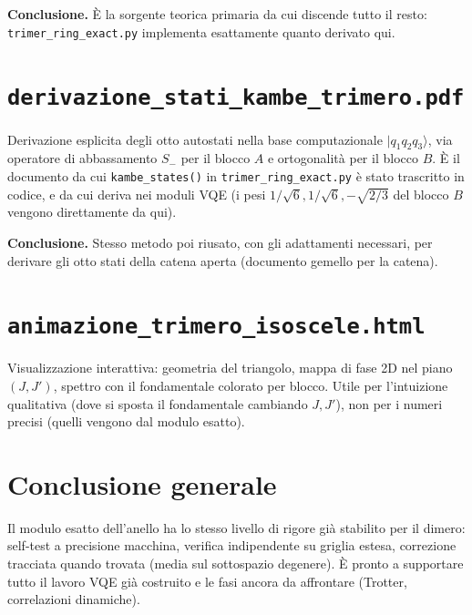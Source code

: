 \documentclass[11pt,a4paper]{article}
\begin{document}
\textbf{Conclusione.} È la sorgente teorica primaria da cui discende tutto il resto:
\texttt{trimer\_ring\_exact.py} implementa esattamente quanto derivato qui.

\section*{\texttt{derivazione\_stati\_kambe\_trimero.pdf}}

Derivazione esplicita degli otto autostati nella base computazionale
$|q_1q_2q_3\rangle$, via operatore di abbassamento $S_-$ per il blocco $A$ e
ortogonalità per il blocco $B$. È il documento da cui \texttt{kambe\_states()} in
\texttt{trimer\_ring\_exact.py} è stato trascritto in codice, e da cui deriva
 nei moduli VQE (i pesi
$1/\sqrt6,1/\sqrt6,-\sqrt{2/3}$ del blocco $B$ vengono direttamente da qui).

\textbf{Conclusione.} Stesso metodo poi riusato, con gli adattamenti necessari, per
derivare gli otto stati della catena aperta (documento gemello per la catena).

\section*{\texttt{animazione\_trimero\_isoscele.html}}

Visualizzazione interattiva: geometria del triangolo, mappa di fase 2D nel piano
$(J,J')$, spettro con il fondamentale colorato per blocco. Utile per l'intuizione
qualitativa (dove si sposta il fondamentale cambiando $J,J'$), non per i numeri
precisi (quelli vengono dal modulo esatto).

\section*{Conclusione generale}

Il modulo esatto dell'anello ha lo stesso livello di rigore già stabilito per il
dimero: self-test a precisione macchina, verifica indipendente su griglia estesa,
correzione tracciata quando trovata (media sul sottospazio degenere). È pronto a
supportare tutto il lavoro VQE già costruito e le fasi ancora da affrontare (Trotter,
correlazioni dinamiche).
\end{document}
